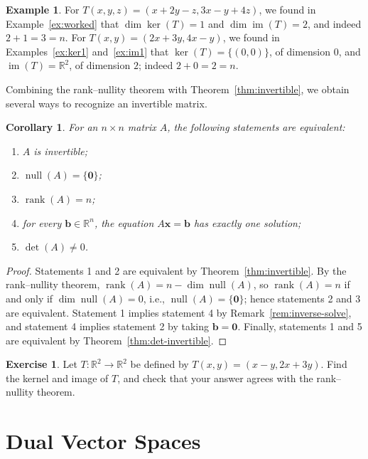 \documentclass[11pt]{article}
\theoremstyle{definition}
\newtheorem{example}[definition]{Example}
\newtheorem{exercise}[definition]{Exercise}
\theoremstyle{plain}
\newtheorem{corollary}[definition]{Corollary}
\theoremstyle{remark}
\DeclareMathOperator{\im}{im}
\DeclareMathOperator{\rank}{rank}
\DeclareMathOperator{\Null}{null}
\begin{document}
\begin{example}
    For $T(x, y, z) = (x + 2y - z, 3x - y + 4z)$, we found in Example~\ref{ex:worked} that $\dim \ker(T) = 1$ and $\dim \im(T) = 2$, and indeed $2 + 1 = 3 = n$. For $T(x, y) = (2x + 3y, 4x - y)$, we found in Examples~\ref{ex:ker1} and~\ref{ex:im1} that $\ker(T) = \{(0, 0)\}$, of dimension $0$, and $\im(T) = \mathbb{R}^2$, of dimension $2$; indeed $2 + 0 = 2 = n$.
\end{example}

Combining the rank--nullity theorem with Theorem~\ref{thm:invertible}, we obtain several ways to recognize an invertible matrix.

\begin{corollary}\label{cor:invertible-rank}
    For an $n \times n$ matrix $A$, the following statements are equivalent:
    \begin{enumerate}
        \item $A$ is invertible;
        \item $\Null(A) = \{\mathbf{0}\}$;
        \item $\rank(A) = n$;
        \item for every $\mathbf{b} \in \mathbb{R}^n$, the equation $A\mathbf{x} = \mathbf{b}$ has exactly one solution;
        \item $\det(A) \neq 0$.
    \end{enumerate}
\end{corollary}

\begin{proof}
    Statements 1 and 2 are equivalent by Theorem~\ref{thm:invertible}. By the rank--nullity theorem, $\rank(A) = n - \dim \Null(A)$, so $\rank(A) = n$ if and only if $\dim \Null(A) = 0$, i.e., $\Null(A) = \{\mathbf{0}\}$; hence statements 2 and 3 are equivalent. Statement 1 implies statement 4 by Remark~\ref{rem:inverse-solve}, and statement 4 implies statement 2 by taking $\mathbf{b} = \mathbf{0}$. Finally, statements 1 and 5 are equivalent by Theorem~\ref{thm:det-invertible}.
\end{proof}

\begin{exercise}
    Let $T: \mathbb{R}^2 \to \mathbb{R}^2$ be defined by $T(x, y) = (x - y, 2x + 3y)$. Find the kernel and image of $T$, and check that your answer agrees with the rank--nullity theorem.
\end{exercise}

\section{Dual Vector Spaces}\label{sec:dual}
\end{document}
